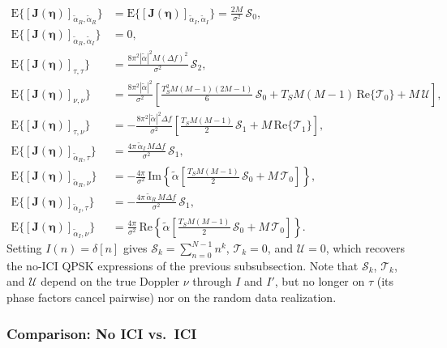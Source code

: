 \documentclass[11pt]{article}
\begin{document}
\begin{align}
    \mathrm{E}\{[\bm{J}(\bm{\eta})]_{\tilde{\alpha}_{R}, \tilde{\alpha}_{R}}\} &= \mathrm{E}\{[\bm{J}(\bm{\eta})]_{\tilde{\alpha}_{I}, \tilde{\alpha}_{I}}\} = \frac{2M}{\sigma^2}\, \mathcal{S}_0, \\
    \mathrm{E}\{[\bm{J}(\bm{\eta})]_{\tilde{\alpha}_{R}, \tilde{\alpha}_{I}}\} &= 0, \\
    \mathrm{E}\{[\bm{J}(\bm{\eta})]_{\tau, \tau}\} &= \frac{8\pi^2 |\tilde{\alpha}|^2 M (\Delta f)^2}{\sigma^2}\, \mathcal{S}_2, \\
    \mathrm{E}\{[\bm{J}(\bm{\eta})]_{\nu, \nu}\} &= \frac{8\pi^2 |\tilde{\alpha}|^2}{\sigma^2} \left[ \frac{T_S^2 M(M-1)(2M-1)}{6}\, \mathcal{S}_0 + T_S M(M-1)\, \text{Re}\{\mathcal{T}_0\} + M\, \mathcal{U} \right], \\
    \mathrm{E}\{[\bm{J}(\bm{\eta})]_{\tau, \nu}\} &= -\frac{8\pi^2 |\tilde{\alpha}|^2 \Delta f}{\sigma^2} \left[ \frac{T_S M(M-1)}{2}\, \mathcal{S}_1 + M\, \text{Re}\{\mathcal{T}_1\} \right], \\
    \mathrm{E}\{[\bm{J}(\bm{\eta})]_{\tilde{\alpha}_{R}, \tau}\} &= \frac{4\pi\, \tilde{\alpha}_I\, M \Delta f}{\sigma^2}\, \mathcal{S}_1, \\
    \mathrm{E}\{[\bm{J}(\bm{\eta})]_{\tilde{\alpha}_{R}, \nu}\} &= -\frac{4\pi}{\sigma^2}\, \text{Im}\left\{ \tilde{\alpha} \left[ \frac{T_S M(M-1)}{2}\, \mathcal{S}_0 + M\, \mathcal{T}_0 \right] \right\}, \\
    \mathrm{E}\{[\bm{J}(\bm{\eta})]_{\tilde{\alpha}_{I}, \tau}\} &= -\frac{4\pi\, \tilde{\alpha}_R\, M \Delta f}{\sigma^2}\, \mathcal{S}_1, \\
    \mathrm{E}\{[\bm{J}(\bm{\eta})]_{\tilde{\alpha}_{I}, \nu}\} &= \frac{4\pi}{\sigma^2}\, \text{Re}\left\{ \tilde{\alpha} \left[ \frac{T_S M(M-1)}{2}\, \mathcal{S}_0 + M\, \mathcal{T}_0 \right] \right\}.
\end{align}
Setting \(I(n) = \delta[n]\) gives \(\mathcal{S}_k = \sum_{n=0}^{N-1} n^k\), \(\mathcal{T}_k = 0\), and \(\mathcal{U} = 0\), which recovers the no-ICI QPSK expressions of the previous subsubsection. Note that \(\mathcal{S}_k\), \(\mathcal{T}_k\), and \(\mathcal{U}\) depend on the true Doppler \(\nu\) through \(I\) and \(I'\), but no longer on \(\tau\) (its phase factors cancel pairwise) nor on the random data realization.

\subsubsection{Comparison: No ICI vs.\ ICI}
\end{document}
